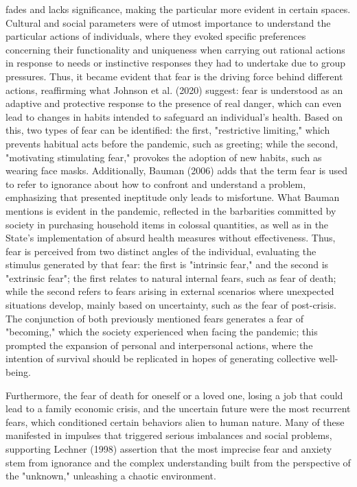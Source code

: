 \documentclass{article}
\begin{document}
fades and lacks significance, making the particular more evident in certain spaces. Cultural and social parameters were of utmost importance to understand the particular actions of individuals, where they evoked specific preferences concerning their functionality and uniqueness when carrying out rational actions in response to needs or instinctive responses they had to undertake due to group pressures. Thus, it became evident that fear is the driving force behind different actions, reaffirming what Johnson et al. (2020) suggest: fear is understood as an adaptive and protective response to the presence of real danger, which can even lead to changes in habits intended to safeguard an individual's health. Based on this, two types of fear can be identified: the first, "restrictive limiting," which prevents habitual acts before the pandemic, such as greeting; while the second, "motivating stimulating fear," provokes the adoption of new habits, such as wearing face masks. Additionally, Bauman (2006) adds that the term fear is used to refer to ignorance about how to confront and understand a problem, emphasizing that presented ineptitude only leads to misfortune. What Bauman mentions is evident in the pandemic, reflected in the barbarities committed by society in purchasing household items in colossal quantities, as well as in the State's implementation of absurd health measures without effectiveness. Thus, fear is perceived from two distinct angles of the individual, evaluating the stimulus generated by that fear: the first is "intrinsic fear," and the second is "extrinsic fear"; the first relates to natural internal fears, such as fear of death; while the second refers to fears arising in external scenarios where unexpected situations develop, mainly based on uncertainty, such as the fear of post-crisis. The conjunction of both previously mentioned fears generates a fear of "becoming," which the society experienced when facing the pandemic; this prompted the expansion of personal and interpersonal actions, where the intention of survival should be replicated in hopes of generating collective well-being.

Furthermore, the fear of death for oneself or a loved one, losing a job that could lead to a family economic crisis, and the uncertain future were the most recurrent fears, which conditioned certain behaviors alien to human nature. Many of these manifested in impulses that triggered serious imbalances and social problems, supporting Lechner (1998) assertion that the most imprecise fear and anxiety stem from ignorance and the complex understanding built from the perspective of the "unknown," unleashing a chaotic environment.
\end{document}
